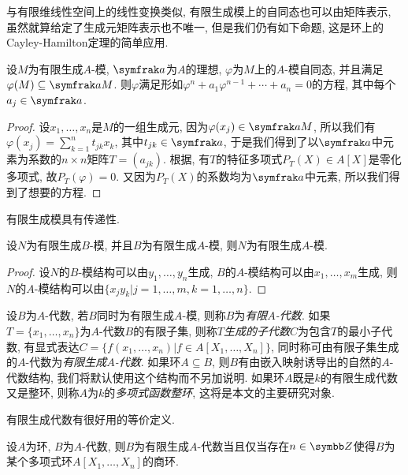 与有限维线性空间上的线性变换类似, 有限生成模上的自同态也可以由矩阵表示, 虽然就算给定了生成元矩阵表示也不唯一, 但是我们仍有如下命题, 这是环上的Cayley-Hamilton定理的简单应用.

\begin{proposition}\label{prop:fgmoduleendomorphism}
  设$M$为有限生成$A$-模, $\ideal{a}$为$A$的理想, $\varphi$为$M$上的$A$-模自同态, 并且满足$\varphi(M)\subseteq \ideal{a}M$. 则$\varphi$满足形如$\varphi^n+a_1\varphi^{n-1}+\dotsb +a_n=0$的方程, 其中每个$a_j\in \ideal{a}$.
\end{proposition}

\begin{proof}
  设$x_1, \dotsc, x_n$是$M$的一组生成元, 因为$\varphi (x_j)\in \ideal{a}M$, 所以我们有$\varphi (x_j)=\sum_{k=1}^n t_{jk}x_k$, 其中$t_{jk}\in \ideal{a}$, 于是我们得到了以$\ideal{a}$中元素为系数的$n\times n$矩阵$T=(a_{jk})$. 根据, 有$T$的特征多项式$P_T(X)\in A[X]$是零化多项式, 故$P_T(\varphi)=0$. 又因为$P_T(X)$的系数均为$\ideal{a}$中元素, 所以我们得到了想要的方程.
\end{proof}

有限生成模具有传递性.

\begin{proposition}\label{prop:fgmodule}
  设$N$为有限生成$B$-模, 并且$B$为有限生成$A$-模, 则$N$为有限生成$A$-模.
\end{proposition}

\begin{proof}
  设$N$的$B$-模结构可以由$y_1, \dotsc, y_n$生成, $B$的$A$-模结构可以由$x_1, \dotsc, x_m$生成, 则$N$的$A$-模结构可以由$\{x_jy_k\vert j=1, \dotsc, m, k=1, \dotsc, n\}$.
\end{proof}

设$B$为$A$-代数, 若$B$同时为有限生成$A$-模, 则称$B$为\emph{有限$A$-代数}. 如果$T=\{x_1, \dotsc, x_n\}$为$A$-代数$B$的有限子集, 则称$T$\emph{生成的子代数}$C$为包含$T$的最小子代数, 有显式表达$C=\{f(x_1, \dotsc, x_n)\vert f\in A[X_1, \dotsc, X_n]\}$, 同时称可由有限子集生成的$A$-代数为\emph{有限生成$A$-代数}. 如果环$A\subseteq B$, 则$B$有由嵌入映射诱导出的自然的$A$-代数结构, 我们将默认使用这个结构而不另加说明. 如果环$A$既是$k$的有限生成代数又是整环, 则称$A$为$k$的\emph{多项式函数整环}, 这将是本文的主要研究对象.

有限生成代数有很好用的等价定义.

\begin{proposition}\label{prop:fgalgebra}
  设$A$为环, $B$为$A$-代数, 则$B$为有限生成$A$-代数当且仅当存在$n\in \ZZ$使得$B$为某个多项式环$A[X_1, \dotsc, X_n]$的商环.
\end{proposition}

